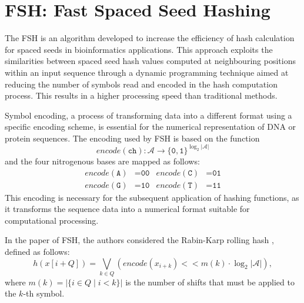 \section{FSH: Fast Spaced Seed Hashing}
\label{sec:FSH}

The \ac{FSH} \cite{girotto2018fsh} is an algorithm developed to increase the efficiency of hash calculation for spaced seeds in bioinformatics applications. This approach exploits the similarities between spaced seed hash values computed at neighbouring positions within an input sequence through a dynamic programming technique aimed at reducing the number of symbols read and encoded in the hash computation process. This results in a higher processing speed than traditional methods.

Symbol encoding, a process of transforming data into a different format using a specific encoding scheme, is essential for the numerical representation of DNA or protein sequences. The encoding used by \acs{FSH} is based on the function \[ encode(\texttt{ch}): \mathcal{A} \to \{ \texttt{0}, \texttt{1} \}^{\log_2 |\mathcal{A}|} \] and the four nitrogenous bases are mapped as follows: \begin{align*}
	encode(\texttt{A}) &= \texttt{00}  &  encode(\texttt{C}) &= \texttt{01} \\
	encode(\texttt{G}) &= \texttt{10}  &  encode(\texttt{T}) &= \texttt{11} 
\end{align*}
This encoding is necessary for the subsequent application of hashing functions, as it transforms the sequence data into a numerical format suitable for computational processing.

In the paper of \acs{FSH}, the authors considered the Rabin-Karp rolling hash \cite{cormen2009introduction}, defined as follows: \[ h\left( x[i + Q] \right) = \bigvee_{k \in Q} \left( encode(x_{i + k}) <\!< m(k) \cdot \log_2 |\mathcal{A}| \right), \] where $m(k) = \left| \{ i \in Q \; | \; i < k \} \right| $ is the number of shifts that must be applied to the $k$-th symbol. 

